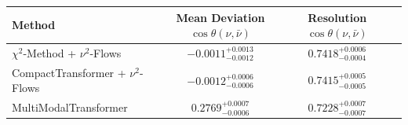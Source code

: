     \begin{tabular}{lccc}
        \toprule
        Method & Mean Deviation $\cos\theta(\nu, \bar{\nu})$ & Resolution $\cos\theta(\nu, \bar{\nu})$ \\
        \midrule
        $\chi^2$-Method + $\nu^2$-Flows & $-0.0011^{+0.0013}_{-0.0012}$ & $0.7418^{+0.0006}_{-0.0004}$ \\
        CompactTransformer + $\nu^2$-Flows & $-0.0012^{+0.0006}_{-0.0006}$ & $0.7415^{+0.0005}_{-0.0005}$ \\
        MultiModalTransformer & $0.2769^{+0.0007}_{-0.0006}$ & $0.7228^{+0.0007}_{-0.0007}$ \\
        \bottomrule
    \end{tabular}